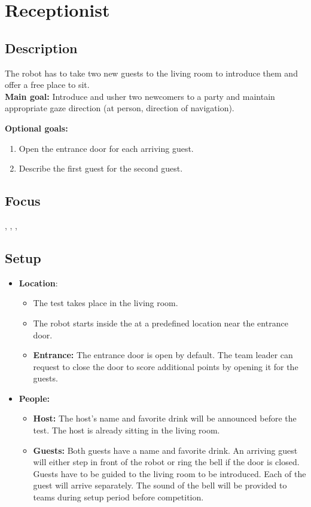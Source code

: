 \section{Receptionist}
\label{test:receptionist}
\subsection*{Description}
The robot has to take two new guests to the living room to introduce them and offer a free place to sit.\\
    
\textbf{Main goal:}
    Introduce and usher two newcomers to a party and maintain appropriate gaze direction (at person, direction of navigation).

\textbf{Optional goals:}
\begin{enumerate}[nosep]
	\item Open the entrance door for each arriving guest.
	\item Describe the first guest for the second guest.
\end{enumerate}

\subsection*{Focus}
\SysI{}, \HRI{}, \PerDet{}, \PerRec

\subsection*{Setup}
\begin{itemize}
	\item \textbf{Location}: 
	\begin{itemize}
	\item The test takes place in the living room.	
	\item The robot starts inside the \Arena{} at a predefined location near the entrance door.
	\item \textbf{Entrance:} The entrance door is open by default. The team leader can request to close the door to score additional points by opening it for the guests.
	\end{itemize}
	
	\item \textbf{People:} 
	\begin{itemize}
	\item \textbf{Host:} The host's name and favorite drink will be announced before the test. The host is already sitting in the living room.

	\item \textbf{Guests:} Both guests have a name and favorite drink. An arriving guest will either step in front of the robot or ring the bell if the door is closed. Guests have to be guided to the living room to be introduced. Each of the guest will arrive separately. The sound of the bell will be provided to teams
	during setup period before competition.
	\end{itemize}

\end{itemize}

